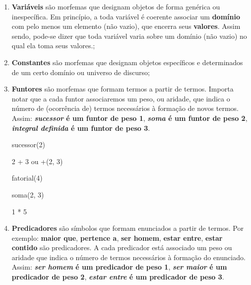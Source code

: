 \begin{enumerate}[label=\arabic*)]
    \item \textbf{Variáveis} são morfemas que designam objetos de forma genérica ou inespecífica.
    Em princípio, a toda variável é coerente associar um \textbf{domínio} com pelo menos um elemento (não vazio), que encerra seus \textbf{valores}.
    Assim sendo, pode-se dizer que toda variável varia sobre um domínio (não vazio) no qual ela toma seus valores.;

    \item \textbf{Constantes} são morfemas que designam objetos específicos e determinados de um certo domínio ou universo de discurso;

    \item \textbf{Funtores} são morfemas que formam termos a partir de termos.
    Importa notar que a cada funtor associaremos um peso, ou aridade, que indica o número de (ocorrência de) termos necessários à formação de novos termos.
    Assim: \textbf{\textit{sucessor} é um funtor de peso 1}, \textbf{\textit{soma} é um funtor de peso 2}, \textbf{\textit{integral definida} é um funtor de peso 3}.

    \begin{exemplo}
            sucessor(2)
    \end{exemplo}
    \begin{exemplo}
            2 + 3 ou +(2, 3)
    \end{exemplo}
    \begin{exemplo}
            fatorial(4)
    \end{exemplo}
    \begin{exemplo}
            soma(2, 3)
    \end{exemplo}
    \begin{exemplo}
            1 * 5
    \end{exemplo}

    \item \textbf{Predicadores} são símbolos que formam enunciados a partir de termos.
    Por exemplo: \textbf{maior que}, \textbf{pertence a}, \textbf{ser homem}, \textbf{estar entre}, \textbf{estar contido} são predicadores.
    A cada predicador está associado um peso ou aridade que indica o número de termos necessários à formação do enunciado.
    Assim: \textbf{\textit{ser homem} é um predicador de peso 1}, \textbf{\textit{ser maior} é um predicador de peso 2}, \textbf{\textit{estar entre} é um predicador de peso 3}.


\end{enumerate}
